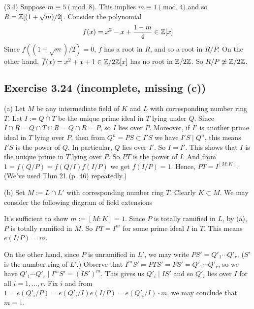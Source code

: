 \documentclass[../Marcus.tex]{subfiles}
\begin{document}
(3.4) Suppose $m\equiv 5\pmod{8}$. This implies $m\equiv 1\pmod{4}$ and so $R=\mathbb{Z}[{(1+\sqrt{m})/2}]$. Consider the polynomial $$f(x)=x^2-x+\frac{1-m}{4}\in\mathbb{Z}[x]$$ Since $f((1+\sqrt{m})/2)=0$, $f$ has a root in $R$, and so a root in $R/P$. On the other hand, $\overline{f}(x)=x^2+x+1\in\mathbb{Z}/2\mathbb{Z}[x]$ has no root in $\mathbb{Z}/2\mathbb{Z}$. So $R/P\not\simeq\mathbb{Z}/2\mathbb{Z}$.

\subsection*{Exercise 3.24 \color{red}(incomplete, missing (c))}

(a) Let $M$ be any intermediate field of $K$ and $L$ with corresponding number ring $T$. Let $I:=Q\cap T$ be the unique prime ideal in $T$ lying under $Q$. Since $I\cap R=Q\cap T\cap R=Q\cap R=P$, so $I$ lies over $P$. Moreover, if $I'$ is another prime ideal in $T$ lying over $P$, then from $Q^n=PS\subset I'S$ we have $I'S\mid Q^n$, this means $I'S$ is the power of $Q$. In particular, $Q$ lies over $I'$. So $I=I'$. This shows that $I$ is the unique prime in $T$ lying over $P$. So $PT$ is the power of $I$. And from $1=f(Q/P)=f(Q/I)f(I/P)$ we get $f(I/P)=1$. Hence, $PT=I^{[M:K]}$. (We've used Thm 21 (p. 46) repeatedly.)

(b) Set $M:=L\cap L'$ with corresponding number ring $T$. Clearly $K\subset M$. We may consider the following diagram of field extensions
\begin{center}
\end{center}
It's sufficient to show $m:=[M:K]=1$. Since $P$ is totally ramified in $L$, by (a), $P$ is totally ramified in $M$. So $PT=I^m$ for some prime ideal $I$ in $T$. This means $e(I/P)=m$.

On the other hand, since $P$ is unramified in $L'$, we may write $PS'=Q'_1\cdots Q'_r$. ($S'$ is the number ring of $L'$.) Observe that $I^mS'=PTS'=PS'=Q'_1\cdots Q'_r$, so we have $Q'_1\cdots Q'_r\mid I^mS'=(IS')^m$. This gives us $Q'_i\mid IS'$ and so $Q'_i$ lies over $I$ for all $i=1,\ldots,r$. Fix $i$ and from $1=e(Q'_i/P)=e(Q'_i/I)e(I/P)=e(Q'_i/I)\cdot m$, we may conclude that $m=1$.

\end{document}
